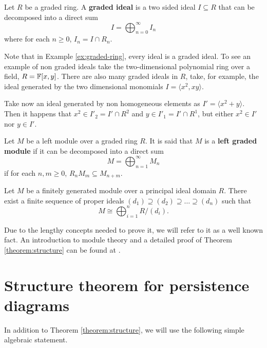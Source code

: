\begin{definition}
    Let $ R $ be a graded ring. A {\bf graded ideal} is a two sided ideal $ I \subseteq R $ that can be decomposed into a direct sum
    \begin{equation}
        I = \bigoplus_{n=0}^{\infty} I_n
    \end{equation}
    where for each $n \geq 0 $, $ I_n = I \cap R_n $.
\end{definition}

\begin{example}
    Note that in Example \ref{ex:graded-ring}, every ideal is a graded ideal. To see an example of non graded ideals take the two-dimensional polynomial ring over a field, $ R = \mathbb F[x, y] $. There are also many graded ideals in $ R $, take, for example, the ideal generated by the two dimensional monomials $ I = \langle x^2, xy \rangle $.

    Take now an ideal generated by non homogeneous elements as $ I' = \langle x^2 + y \rangle $. Then it happens that $ x^2 \in I'_2 = I' \cap R^2 $ and $ y \in I'_1 = I' \cap R^1 $, but either $ x^2 \in I' $ nor $ y \in I' $.
\end{example}

\begin{definition}
    Let $M$ be a left module over a graded ring $ R $. It is said that $ M $ is a {\bf left graded module} if it can be decomposed into a direct sum
    $$
        M = \bigoplus_{n=1}^{\infty} M_n
    $$
    if for each $n, m \geq 0 $, $ R_n M_m \subseteq M_{n+m} $.
\end{definition}

\begin{theorem} \label{theorem:structure}
    Let $ M $ be a  finitely generated module over a principal ideal domain $R$. There exist a finite sequence of proper ideals $ (d_1) \supseteq (d_2) \supseteq \dots \supseteq (d_n) $ such that
    $$
        M \cong \bigoplus_{i=1}^n R / (d_i).
    $$
\end{theorem}

Due to the lengthy concepts needed to prove it, we will refer to it as a well known fact. An introduction to module theory and a detailed proof of Theorem \ref{theorem:structure} can be found at \cite[Chapter IV]{hungerford}.

\section{Structure theorem for persistence diagrams} \label{sec:structure-persistence}
In addition to Theorem \ref{theorem:structure}, we will use the following simple algebraic statement.

